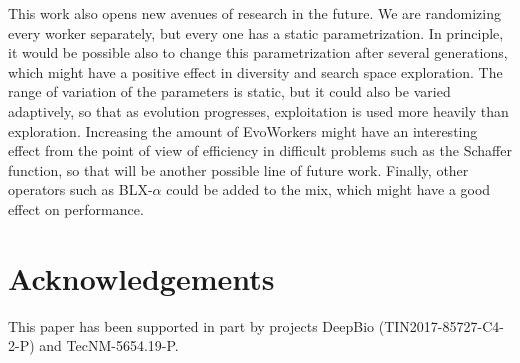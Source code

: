 \documentclass[conference]{IEEEtran}
\begin{document}
This work also opens new avenues of research in the future. We are
randomizing every worker separately, but every one has a static
parametrization. In principle, it would be possible also to change
this parametrization after several generations, which might have a
positive effect in diversity and search space exploration. The range
of variation of the parameters is static, but it could also be varied
adaptively, so that as evolution progresses, exploitation is used more
heavily than exploration. Increasing the amount of EvoWorkers might
have an interesting effect from the point of view of efficiency in
difficult problems such as the Schaffer function, so that will be
another possible line of future work.
Finally, other operators such as
BLX-$\alpha$ could be added to the mix, which might have a good effect
on performance.


\section*{Acknowledgements}

This paper has been supported in part by projects DeepBio (TIN2017-85727-C4-2-P)
and TecNM-5654.19-P.






\end{document}

